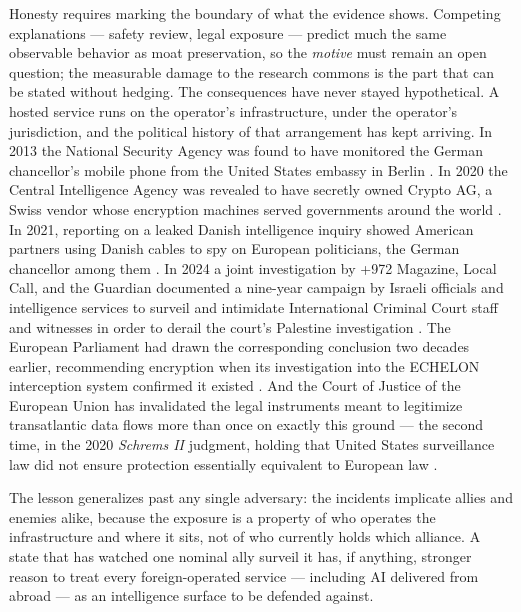 \documentclass[11pt,a4paper]{article}
\begin{document}
Honesty requires marking the boundary of what the evidence shows. Competing
explanations --- safety review, legal exposure --- predict much the same
observable behavior as moat preservation, so the \emph{motive} must remain an
open question; the measurable damage to the research commons is the part
that can be stated without hedging. The consequences have never stayed hypothetical. A hosted service runs on the
operator's infrastructure, under the operator's jurisdiction, and the political
history of that arrangement has kept arriving. In 2013 the National Security
Agency was found to have monitored the German chancellor's mobile phone from
the United States embassy in Berlin \autocite{spiegel2013merkel}. In 2020 the
Central Intelligence Agency was revealed to have secretly owned Crypto AG, a
Swiss vendor whose encryption machines served governments around the world
\autocite{cryptoag2020rubicon}. In 2021, reporting on a leaked Danish
intelligence inquiry showed American partners using Danish cables to spy on
European politicians, the German chancellor among them
\autocite{dunhammer2021spying}. In 2024 a joint investigation by
+972 Magazine, Local Call, and the Guardian documented a nine-year campaign
by Israeli officials and intelligence services to surveil and intimidate
International Criminal Court staff and witnesses in order to derail the
court's Palestine investigation \autocite{iraqi2024icc}. The European Parliament had drawn the
corresponding conclusion two decades earlier, recommending encryption when its
investigation into the ECHELON interception system confirmed it existed
\autocite{echelon2001resolution}. And the Court of Justice of the European
Union has invalidated the legal instruments meant to legitimize transatlantic
data flows more than once on exactly this ground --- the second time, in the
2020 \emph{Schrems II} judgment, holding that United States surveillance law
did not ensure protection essentially equivalent to European law
\autocite{schrems2020judgment}.

The lesson generalizes past any single adversary: the incidents implicate
allies and enemies alike, because the exposure is a property of who operates
the infrastructure and where it sits, not of who currently holds which
alliance. A state that has watched one nominal ally surveil it has, if
anything, stronger reason to treat every foreign-operated service ---
including AI delivered from abroad --- as an intelligence surface to be
defended against.
\end{document}
